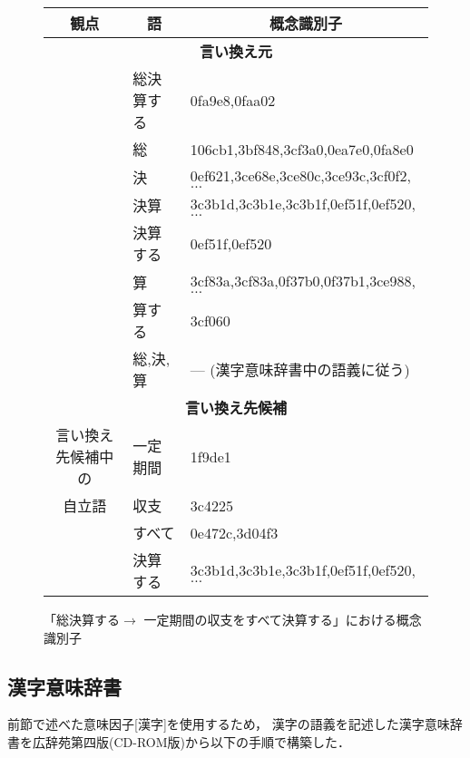    \begin{figure}[t]
	\begin{center}
	 \begin{tabular}{c|l|l}\hline
	  観点 & \multicolumn{1}{c|}{語} & \multicolumn{1}{c}{概念識別子} \\ \hline 
	  \multicolumn{3}{c}{{\bf 言い換え元}}\\ \hline
	  [全体] & 総決算する & 0fa9e8,0faa02 \\ \hline
	  [部分] & 総       & 106cb1,3bf848,3cf3a0,0ea7e0,0fa8e0 \\ \cline{2-3}
	  & 決       & 0ef621,3ce68e,3ce80c,3ce93c,3cf0f2,$\ldots$ \\ \cline{2-3}
	  & 決算     & 3c3b1d,3c3b1e,3c3b1f,0ef51f,0ef520,$\ldots$ \\ \cline{2-3}
	  & 決算する & 0ef51f,0ef520 \\ \cline{2-3}
	  & 算       & 3cf83a,3cf83a,0f37b0,0f37b1,3ce988,$\ldots$ \\ \cline{2-3}
	  & 算する   & 3cf060 \\ \hline 
	  [漢字] & 総,決,算 & --- (漢字意味辞書中の語義に従う)\\ \hline  \hline
	  \multicolumn{3}{c}{{\bf 言い換え先候補}}\\ \hline
	  言い換え先候補中の & 一定期間 & 1f9de1 \\ \cline{2-3}
	  自立語     & 収支     & 3c4225 \\ \cline{2-3}
	  & すべて   & 0e472c,3d04f3 \\ \cline{2-3}
	  & 決算する & 3c3b1d,3c3b1e,3c3b1f,0ef51f,0ef520,$\ldots$ \\ \hline
	 \end{tabular}
	\end{center}
	 \caption{\label{paraph}「総決算する$\rightarrow$ 一定期間の収支をすべて決算する」における概念識別子}
   \end{figure}

\subsection{漢字意味辞書}
\label{subsec:kanji meaning dic}
前節で述べた意味因子[漢字]を使用するため，
漢字の語義を記述した漢字意味辞書を広辞苑第四版(CD-ROM版)\cite{kojien}から以下の手順で構築した．
  
